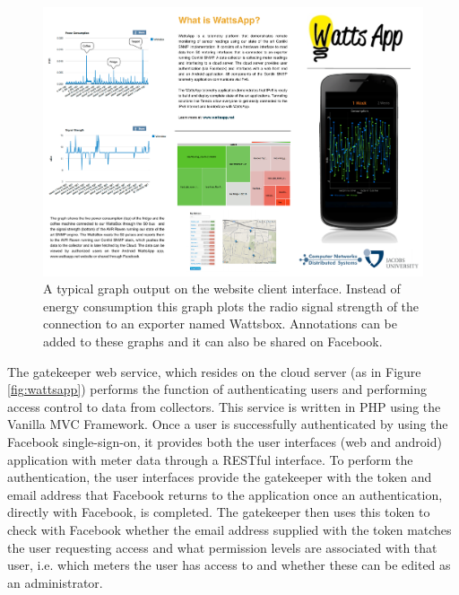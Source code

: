 \documentclass[10pt, conference, compsocconf]{IEEEtran}
\begin{document}
\begin{figure}[t]
\begin{centering}
\includegraphics[scale=0.93]{images/signal-strength} 
\par\end{centering}

\caption{A typical graph output on the website client interface. Instead of
energy consumption this graph plots the radio signal strength of the
connection to an exporter named Wattsbox. Annotations can be added
to these graphs and it can also be shared on Facebook. }


\label{fig:website-signal-strength}
\end{figure}


The gatekeeper web service, which resides on the cloud server (as
in Figure \ref{fig:wattsapp}) performs the function of authenticating
users and performing access control to data from collectors. This
service is written in PHP using the Vanilla MVC Framework. Once a
user is successfully authenticated by using the Facebook single-sign-on,
it provides both the user interfaces (web and android) application
with meter data through a RESTful interface. To perform the authentication,
the user interfaces provide the gatekeeper with the token and email
address that Facebook returns to the application once an authentication,
directly with Facebook, is completed. The gatekeeper then uses this
token to check with Facebook whether the email address supplied with
the token matches the user requesting access and what permission levels
are associated with that user, i.e. which meters the user has access
to and whether these can be edited as an administrator.
\end{document}
